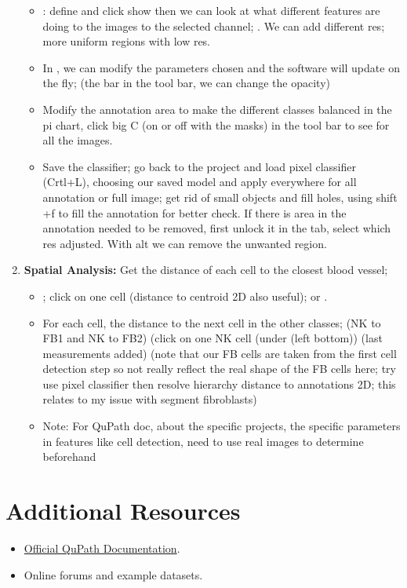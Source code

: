 \documentclass[a4paper,12pt]{article}
\begin{document}
\begin{enumerate}
\begin{itemize}
        \item \soln {} \solnend: define and click show then we can look at what different features are doing to the images to the selected channel; \soln {}\solnend. We can add different res; more uniform regions with low res.
        \item In \soln {} \solnend, we can modify the parameters chosen and the software will update on the fly; (the bar in the tool bar, we can change the opacity)
        \item Modify the annotation area to make the different classes balanced in the pi chart, click big C (on or off with the masks) in the tool bar to see for all the images.
        \item Save the classifier; go back to the project and load pixel classifier (Crtl+L), choosing our saved model and apply everywhere \soln {} \solnend  for all annotation or full image; get rid of small objects and fill holes, using shift +f to fill the annotation for better check. If there is area in the annotation needed to be removed, first unlock it in the \soln {} \solnend tab, select \soln {} \solnend which res adjusted. With alt we can remove the unwanted region.
        \end{itemize}
        
    \item \textbf{Spatial Analysis:} Get the distance of each cell to the closest blood vessel;
    \begin{itemize}
    \item \soln {} \solnend; click on one cell \soln {} \solnend (distance to centroid 2D also useful); or \soln {}\solnend.
    \item For each cell, the distance to the next cell in the other classes; (NK to FB1 and NK to FB2) (click on one NK cell (under \soln {} \solnend (left bottom)) (last measurements added) (note that our FB cells are taken from the first cell detection step so not really reflect the real shape of the FB cells here; try use pixel classifier  then resolve hierarchy distance to annotations 2D; this relates to my issue with segment fibroblasts)
    \item Note: For QuPath doc, about the specific projects, the specific parameters in features like cell detection, need to use real images to determine beforehand
    \end{itemize}
\end{enumerate}

\section{Additional Resources}
\begin{itemize}
    \item \href{https://qupath.github.io/}{Official QuPath Documentation}.
    \item Online forums and example datasets.
\end{itemize}
\end{document}
